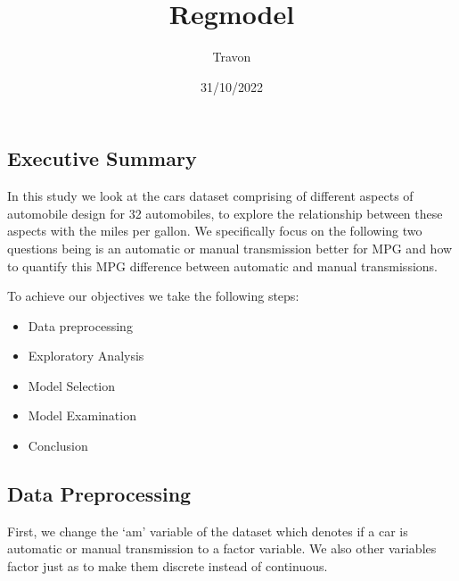 \documentclass[
]{article}
\title{Regmodel}
\author{Travon}
\date{31/10/2022}
\providecommand{\tightlist}{%
  \setlength{\itemsep}{0pt}\setlength{\parskip}{0pt}}
\begin{document}
\maketitle

\hypertarget{executive-summary}{%
\subsection{Executive Summary}\label{executive-summary}}

In this study we look at the cars dataset comprising of different
aspects of automobile design for 32 automobiles, to explore the
relationship between these aspects with the miles per gallon. We
specifically focus on the following two questions being is an automatic
or manual transmission better for MPG and how to quantify this MPG
difference between automatic and manual transmissions.

To achieve our objectives we take the following steps:

\begin{itemize}
\tightlist
\item
  Data preprocessing
\item
  Exploratory Analysis
\item
  Model Selection
\item
  Model Examination
\item
  Conclusion
\end{itemize}

\hypertarget{data-preprocessing}{%
\subsection{Data Preprocessing}\label{data-preprocessing}}

First, we change the `am' variable of the dataset which denotes if a car
is automatic or manual transmission to a factor variable. We also other
variables factor just as to make them discrete instead of continuous.
\end{document}
